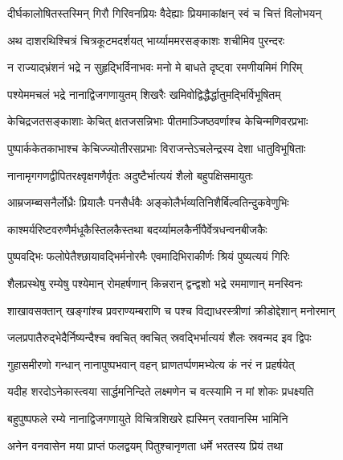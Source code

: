 
\twolineshloka
{दीर्घकालोषितस्तस्मिन् गिरौ गिरिवनप्रियः}
{वैदेह्याः प्रियमाकांक्षन् स्वं च चित्तं विलोभयन्} %

\twolineshloka
{अथ दाशरथिश्चित्रं चित्रकूटमदर्शयत्}
{भार्य्याममरसङ्काशः शचीमिव पुरन्दरः} %

\twolineshloka
{न राज्याद्भ्रंशनं भद्रे न सुहृद्भिर्विनाभवः}
{मनो मे बाधते दृष्ट्वा रमणीयमिमं गिरिम्} %

\twolineshloka
{पश्येममचलं भद्रे नानाद्विजगणायुतम्}
{शिखरैः खमिवोद्विद्धैर्द्धातुमद्भिर्विभूषितम्} %

\twolineshloka
{केचिद्रजतसङ्काशाः केचित् क्षतजसन्निभाः}
{पीतमाञ्जिष्ठवर्णाश्च केचिन्मणिवरप्रभाः} %

\twolineshloka
{पुष्पार्ककेतकाभाश्च केचिज्ज्योतीरसप्रभाः}
{विराजन्तेऽचलेन्द्रस्य देशा धातुविभूषिताः} %

\twolineshloka
{नानामृगगणद्वीपितरक्ष्वृक्षगणैर्वृतः}
{अदुष्टैर्भात्ययं शैलो बहुपक्षिसमायुतः} %

\twolineshloka
{आम्रजम्ब्वसनैर्लोध्रैः प्रियालैः पनसैर्धवैः}
{अङ्कोलैर्भव्यतिनिशैर्बिल्वतिन्दुकवेणुभिः} %

\twolineshloka
{काश्मर्यरिष्टवरुणैर्मधूकैस्तिलकैस्तथा}
{बदर्य्यामलकैर्नीपैर्वेत्रधन्वनबीजकैः} %

\twolineshloka
{पुष्पवद्भिः फलोपेतैश्छायावद्भिर्मनोरमैः}
{एवमादिभिराकीर्णः श्रियं पुष्यत्ययं गिरिः} %

\twolineshloka
{शैलप्रस्थेषु रम्येषु पश्येमान् रोमहर्षणान्}
{किन्नरान् द्वन्द्वशो भद्रे रममाणान् मनस्विनः} %

\twolineshloka
{शाखावसक्तान् खङ्गांश्च प्रवराण्यम्बराणि च}
{पश्च विद्याधरस्त्रीणां क्रीडोद्देशान् मनोरमान्} %

\twolineshloka
{जलप्रपातैरुद्भेदैर्निष्यन्दैश्च क्वचित् क्वचित्}
{स्रवद्भिर्भात्ययं शैलः स्रवन्मद इव द्विपः} %

\twolineshloka
{गुहासमीरणो गन्धान् नानापुष्पभवान् वहन्}
{घ्राणतर्प्पणमभ्येत्य कं नरं न प्रहर्षयेत्} %

\twolineshloka
{यदीह शरदोऽनेकास्त्वया सार्द्धमनिन्दिते}
{लक्ष्मणेन च वत्स्यामि न मां शोकः प्रधक्ष्यति} %

\twolineshloka
{बहुपुष्पफले रम्ये नानाद्विजगणायुते}
{विचित्रशिखरे ह्यस्मिन् रतवानस्मि भामिनि} %

\twolineshloka
{अनेन वनवासेन मया प्राप्तं फलद्वयम्}
{पितुश्चानृणता धर्मे भरतस्य प्रियं तथा} %


